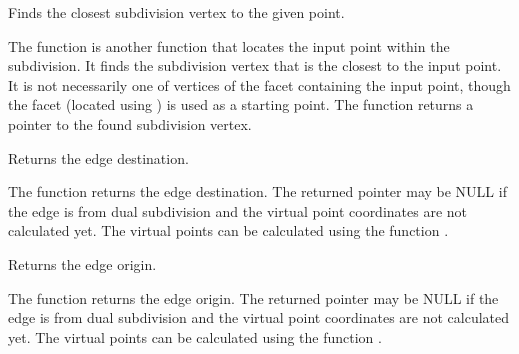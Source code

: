 Finds the closest subdivision vertex to the given point.


\begin{description}
\end{description}

The function is another function that
locates the input point within the subdivision. It finds the subdivision vertex that
is the closest to the input point. It is not necessarily one of vertices
of the facet containing the input point, though the facet (located using
) is used as a starting
point. The function returns a pointer to the found subdivision vertex.

Returns the edge destination.


\begin{description}
\end{description}

The function returns the edge destination. The
returned pointer may be NULL if the edge is from dual subdivision and
the virtual point coordinates are not calculated yet. The virtual points
can be calculated using the function .

Returns the edge origin.


\begin{description}
\end{description}

The function returns the edge
origin. The returned pointer may be NULL if the edge is from dual
subdivision and the virtual point coordinates are not calculated
yet. The virtual points can be calculated using the function
.

